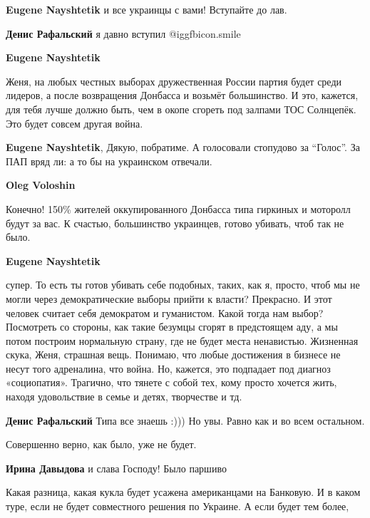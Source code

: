 \begin{itemize}
\begin{itemize}
\textbf{Eugene Nayshtetik} и все украинцы с вами! Вступайте до лав.

\textbf{Денис Рафальский} я давно вступил  @igg{fbicon.smile} 

\textbf{Eugene Nayshtetik} 

Женя, на любых честных выборах дружественная России партия будет среди лидеров,
а после возвращения Донбасса и возьмёт большинство. И это, кажется, для тебя
лучше должно быть, чем в окопе сгореть под залпами ТОС Солнцепёк. Это будет
совсем другая война.

\textbf{Eugene Nayshtetik}, Дякую, побратиме. А голосовали стопудово за \enquote{Голос}. За ПАП вряд ли: а то бы на украинском отвечали.

\textbf{Oleg Voloshin} 

Конечно! 150\% жителей оккупированного Донбасса типа гиркиных и моторолл будут
за вас. К счастью, большинство украинцев, готово убивать, чтоб так не было.

\textbf{Eugene Nayshtetik} 

супер. То есть ты готов убивать себе подобных, таких, как я, просто, чтоб мы не
могли через демократические выборы прийти к власти? Прекрасно. И этот человек
считает себя демократом и гуманистом. Какой тогда нам выбор? Посмотреть со
стороны, как такие безумцы сгорят в предстоящем аду, а мы потом построим
нормальную страну, где не будет места ненавистью. Жизненная скука, Женя,
страшная вещь. Понимаю, что любые достижения в бизнесе не несут того
адреналина, что война. Но, кажется, это подпадает под диагноз «социопатия».
Трагично, что тянете с собой тех, кому просто хочется жить, находя удовольствие
в семье и детях, творчестве и тд.

\textbf{Денис Рафальский} Типа все знаешь :))) Но увы. Равно как и во всем остальном.

\end{itemize} %

Совершенно верно, как было, уже не будет.

\textbf{Ирина Давыдова} и слава Господу! Было паршиво


Какая разница, какая кукла будет усажена американцами на Банковую. И в каком
туре, если не будет совместного решения по Украине. А если будет тем более,

\end{itemize} %
